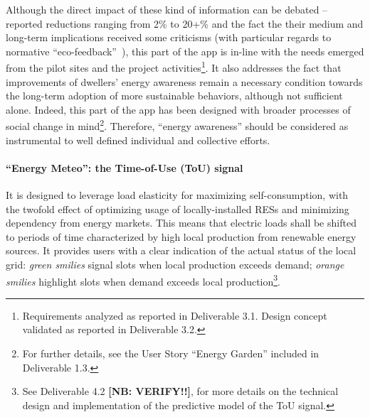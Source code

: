 Although the direct impact of these kind of information can be debated -- reported reductions ranging from 2\% to 20+\% \citep{eea_report} and the fact the their medium and
long-term implications received some criticisms (with particular regards to normative ``eco-feedback''~\citep{Strengers2012,Cakici2014}), this part of the app is in-line with the needs emerged from
the pilot sites and the project activities\footnote{Requirements analyzed as reported in Deliverable 3.1. Design concept validated as reported in Deliverable 3.2.}.
It also addresses the fact that improvements of dwellers' energy awareness remain a necessary condition towards the long-term adoption of more sustainable behaviors,
although not sufficient alone. Indeed, this part of the app has been designed with broader processes of social change
in mind\footnote{For further details, see the User Story ``Energy Garden'' included in Deliverable 1.3.}. Therefore, ``energy awareness'' should be considered as instrumental to
well defined individual and collective efforts. 


\paragraph{``Energy Meteo'': the Time-of-Use (ToU) signal} 
It is designed to leverage load elasticity for maximizing self-consumption, with the twofold effect of optimizing usage of locally-installed RESs and minimizing dependency from energy markets. This means that electric loads shall be shifted to periods of time characterized by high local production from renewable energy sources.
It provides users with a clear indication of the actual status of the local grid: \textit{green smilies} signal slots when local production exceeds demand; \textit{orange smilies} highlight slots
when demand exceeds local production\footnote{See Deliverable 4.2 \textbf{[NB: VERIFY!!]}, for more details on the technical design and implementation of the predictive model of the ToU signal.}.

